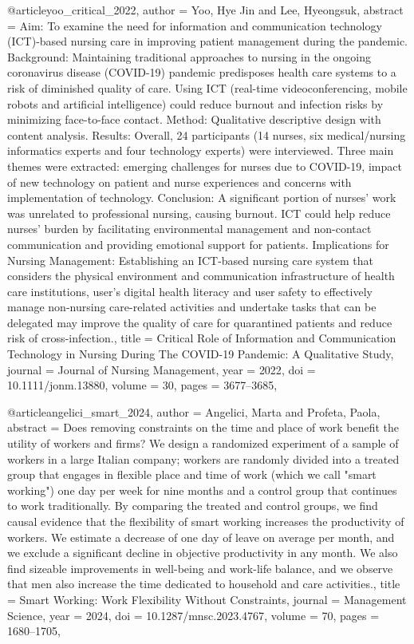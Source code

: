 @article{yoo_critical_2022,
  author = {Yoo, Hye Jin and Lee, Hyeongsuk},
  abstract = {Aim: To examine the need for information and communication technology (ICT)-based nursing care in improving patient management during the pandemic. Background: Maintaining traditional approaches to nursing in the ongoing coronavirus disease (COVID-19) pandemic predisposes health care systems to a risk of diminished quality of care. Using ICT (real-time videoconferencing, mobile robots and artificial intelligence) could reduce burnout and infection risks by minimizing face-to-face contact. Method: Qualitative descriptive design with content analysis. Results: Overall, 24 participants (14 nurses, six medical/nursing informatics experts and four technology experts) were interviewed. Three main themes were extracted: emerging challenges for nurses due to COVID-19, impact of new technology on patient and nurse experiences and concerns with implementation of technology. Conclusion: A significant portion of nurses' work was unrelated to professional nursing, causing burnout. ICT could help reduce nurses' burden by facilitating environmental management and non-contact communication and providing emotional support for patients. Implications for Nursing Management: Establishing an ICT-based nursing care system that considers the physical environment and communication infrastructure of health care institutions, user's digital health literacy and user safety to effectively manage non-nursing care-related activities and undertake tasks that can be delegated may improve the quality of care for quarantined patients and reduce risk of cross-infection.},
  title = {{Critical} {Role} {of} {Information} {and} {Communication} {Technology} {in} {Nursing} {During} {The} {COVID-19} {Pandemic}: {A} {Qualitative} {Study}},
  journal = {Journal of Nursing Management},
  year = {2022},
  doi = {10.1111/jonm.13880},
  volume = {30},
  pages = {3677--3685},
}

@article{angelici_smart_2024,
  author = {Angelici, Marta and Profeta, Paola},
  abstract = {Does removing constraints on the time and place of work benefit the utility of workers and firms? We design a randomized experiment of a sample of workers in a large Italian company; workers are randomly divided into a treated group that engages in flexible place and time of work (which we call "smart working") one day per week for nine months and a control group that continues to work traditionally. By comparing the treated and control groups, we find causal evidence that the flexibility of smart working increases the productivity of workers. We estimate a decrease of one day of leave on average per month, and we exclude a significant decline in objective productivity in any month. We also find sizeable improvements in well-being and work-life balance, and we observe that men also increase the time dedicated to household and care activities.},
  title = {{Smart} {Working}: {Work} {Flexibility} {Without} {Constraints}},
  journal = {Management Science},
  year = {2024},
  doi = {10.1287/mnsc.2023.4767},
  volume = {70},
  pages = {1680--1705},
}

